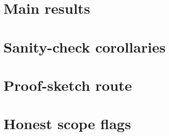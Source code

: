 \documentclass[11pt]{article}
\theoremstyle{definition}
\theoremstyle{plain}
\theoremstyle{remark}
\begin{document}
\section{Main results}

\section{Sanity-check corollaries}

\section{Proof-sketch route}

\section{Honest scope flags}
\end{document}
